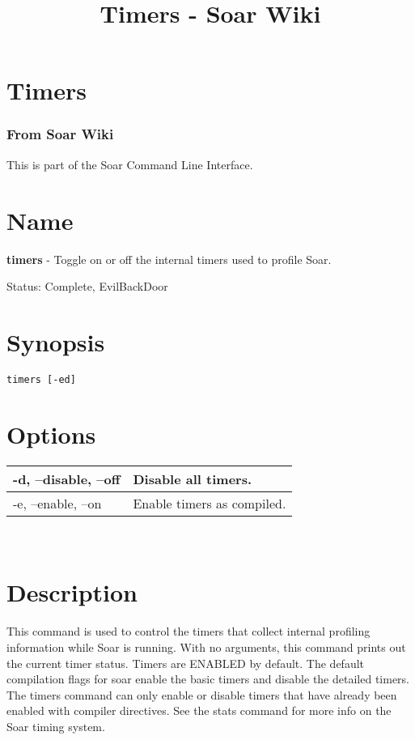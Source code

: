 \documentclass[10pt]{article}
\title{Timers - Soar Wiki}
\begin{document}
\section*{Timers}
\subsubsection*{From Soar Wiki}


 This is part of the Soar Command Line Interface. 
\section*{ Name }


 \textbf{timers}
 - Toggle on or off the internal timers used to profile Soar. 


 Status: Complete, EvilBackDoor
\section*{ Synopsis }
\begin{verbatim}
timers [-ed]

\end{verbatim}
\section*{ Options }


\begin{tabular}{|p{1in}|p{5in}|}
\hline 
 -d, --disable, --off  & Disable all timers.  \\
 \hline 
 -e, --enable, --on  & Enable timers as compiled.  \\
 \hline 

\end{tabular}



 \\ 

\section*{ Description }


 This command is used to control the timers that collect internal profiling information while Soar is running. With no arguments, this command prints out the current timer status. Timers are ENABLED by default. The default compilation flags for soar enable the basic timers and disable the detailed timers. The timers command can only enable or disable timers that have already been enabled with compiler directives. See the stats command for more info on the Soar timing system. 
\end{document}
